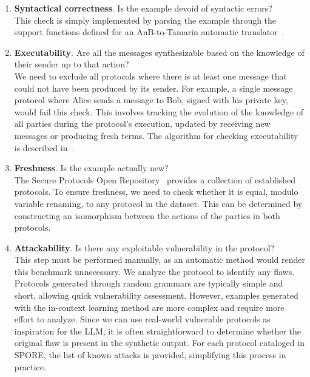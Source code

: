 \begin{enumerate}
    \item \textbf{Syntactical correctness}. Is the example devoid of syntactic errors?\\
    This check is simply implemented by parsing the example through the support functions defined for an AnB-to-Tamarin automatic translator~\cite{basin2015alice}.

    \item \textbf{Executability}. Are all the messages synthesizable based on the knowledge of their sender up to that action?\\
    We need to exclude all protocols where there is at least one message that could not have been produced by its sender. For example, a single message protocol where Alice sends a message to Bob, signed with his private key, would fail this check. This involves tracking the evolution of the knowledge of all parties during the protocol's execution, updated by receiving new messages or producing fresh terms. The algorithm for checking executability is described in~\cite{basin2015alice}.

    \item \textbf{Freshness}. Is the example actually new?\\
    The Secure Protocols Open Repository~\cite{SPORE} provides a collection of established protocols. To ensure freshness, we need to check whether it is equal, modulo variable renaming, to any protocol in the dataset. This can be determined by constructing an isomorphism between the actions of the parties in both protocols.

    \item \textbf{Attackability}. Is there any exploitable vulnerability in the protocol?\\
    This step must be performed manually, as an automatic method would render this benchmark unnecessary. We analyze the protocol to identify any flaws. Protocols generated through random grammars are typically simple and short, allowing quick vulnerability assessment. However, examples generated with the in-context learning method are more complex and require more effort to analyze. Since we can use real-world vulnerable protocols as inspiration for the LLM, it is often straightforward to determine whether the original flaw is present in the synthetic output. For each protocol cataloged in SPORE, the list of known attacks is provided, simplifying this process in practice.
\end{enumerate}

